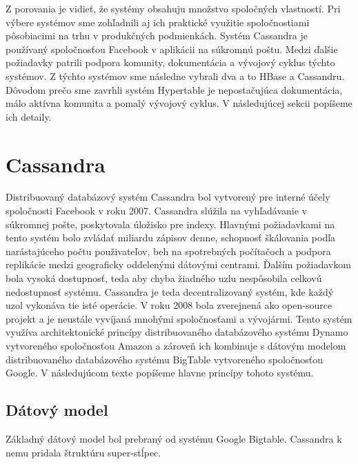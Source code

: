 \documentclass[11pt,twoside,a4paper]{book}
\begin{document}

Z porovania je vidieť, že systémy obsahuju množstvo spoločných vlastností. Pri výbere systémov sme zohľadnili aj ich praktické využitie spoločnostiami pôsobiacimi na trhu v produkčných podmienkách. Systém Cassandra je používaný spoločnosťou Facebook v aplikácii na súkromnú poštu. Medzi ďalšie požiadavky patrili podpora komunity, dokumentácia a vývojový cyklus týchto systémov. Z týchto systémov sme následne vybrali dva a to HBase a Cassandru. Dôvodom prečo sme zavrhli systém Hypertable je nepostačujúca dokumentácia, málo aktívna komunita a pomalý vývojový cyklus. V následujúcej sekcii popíšeme ich detaily.


\section{Cassandra}

Distribuovaný databázový systém Cassandra bol vytvorený pre interné účely spoločnosti Facebook v roku 2007. Cassandra slúžila na vyhľadávanie v súkromnej pošte, poskytovala úložisko pre indexy. Hlavnými požiadavkami na tento systém bolo zvládať miliardu zápisov denne, schopnosť škálovania podľa narástajúceho počtu použivateľov, beh na spotrebných počítačoch a podpora replikácie medzi geograficky oddelenými dátovými centrami. Ďalším požiadavkom bola vysoká dostupnosť, teda aby chyba žiadného uzlu nespôsobila celkovú nedostupnosť systému. Cassandra je teda decentralizovaný systém, kde každý uzol vykonáva tie isté operácie. V roku 2008 bola zverejnená ako open-source projekt a je neustále vyvíjaná mnohými spoločnosťami a vývojármi. Tento systém využíva architektonické princípy distribuovaného databázového systému Dynamo vytvoreného spoločnosťou Amazon a zároveň ich kombinuje s dátovým modelom distribuovaného databázového systému BigTable vytvoreného spoločnosťou Google. V následujúcom texte popíšeme hlavne princípy tohoto systému. 

\subsection{Dátový model}

Základný dátový model bol prebraný od systému Google Bigtable. Cassandra k nemu pridala štruktúru super-stĺpec.
\end{document}
